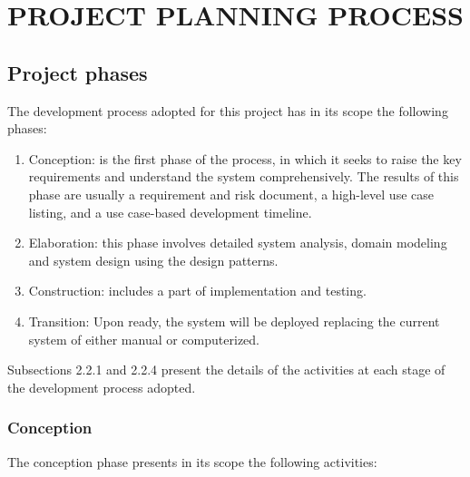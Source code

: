 \documentclass[11pt, twoside, a4paper]{book}
\begin{document}
        \chapter{PROJECT PLANNING PROCESS}
                	
        		\section{Project phases}
        		
					The development process adopted for this project has in its scope the following phases:
        			
        			\begin{enumerate}
        				
						\item Conception: is the first phase of the process, in which it seeks to raise the key requirements and understand the system comprehensively. The results of this phase are usually a requirement and risk document, a high-level use case listing, and a use case-based development timeline.
						\item Elaboration: this phase involves detailed system analysis, domain modeling and system design using the design patterns.
						\item Construction: includes a part of implementation and testing.
        				\item Transition: Upon ready, the system will be deployed replacing the current system of either manual or computerized.
        				
        			\end{enumerate}
        			
        			Subsections 2.2.1 and 2.2.4 present the details of the activities at each stage of the development process adopted.
	        		
	        		\subsection{Conception}

						The conception phase presents in its scope the following activities:	
							
\end{document}
